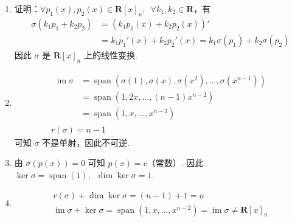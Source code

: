 \documentclass[UTF8,12pt,a4paper,fontset=fandol]{ctexart}
\begin{document}
\begin{solve}
\begin{enumerate}
                \item 证明：$ \forall p_1(x), p_2(x) \in \mathbf{R}[x]_n,\enspace \forall k_1, k_2 \in \mathbf{R} $，有
                      \begin{align*}
                          \sigma(k_1 p_1 + k_2 p_2) & = (k_1 p_1(x) + k_2 p_2(x))'                                    \\
                                                    & = k_1 p_1'(x) + k_2 p_2'(x) = k_1 \sigma(p_1) + k_2 \sigma(p_2)
                      \end{align*}
                      因此 $ \sigma $ 是 $ \mathbf{R}[x]_n $ 上的线性变换.

                \item \begin{gather*}
                          \begin{aligned}
                              \operatorname{im} \sigma & = \operatorname{span}(\sigma(1), \sigma(x), \sigma(x^2), \ldots, \sigma(x^{n - 1})) \\
                                         & = \operatorname{span}(1, 2x, \ldots, (n - 1) x^{n - 2})                             \\
                                         & = \operatorname{span}(1, x, \ldots, x^{n - 2})
                          \end{aligned} \\
                          r(\sigma) = n - 1
                      \end{gather*}
                      可知 $ \sigma $ 不是单射，因此不可逆.

                \item 由 $ \sigma(p(x)) = 0 $ 可知 $ p(x) = c $（常数）. 因此 $ \ker \sigma = \operatorname{span}(1),\enspace \dim \ker \sigma = 1 $.

                \item \begin{gather*}
                          r(\sigma) + \dim \ker \sigma = (n - 1) + 1 = n \\
                          \operatorname{im} \sigma + \ker \sigma = \operatorname{span}(1, x, \ldots, x^{n - 2}) = \operatorname{im} \sigma \neq \mathbf{R}[x]_n
                      \end{gather*}
            \end{enumerate}
\end{solve}
\end{document}
